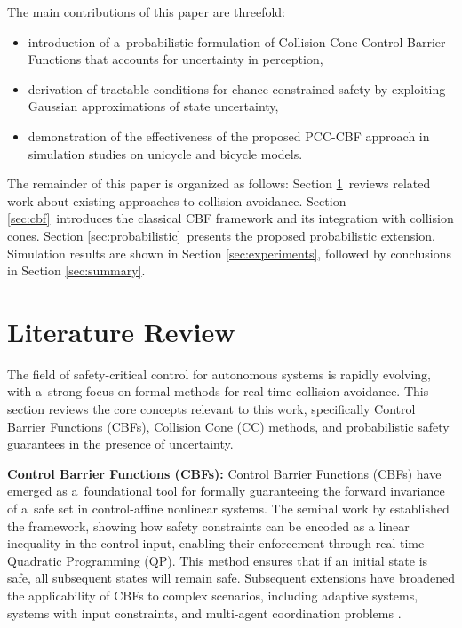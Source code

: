 \documentclass{svproc}
\begin{document}
The main contributions of this paper are threefold:
\begin{itemize}
    \item introduction of a~probabilistic formulation of Collision Cone Control
    Barrier Functions that accounts for uncertainty in perception,
    \item derivation of tractable conditions for chance-constrained safety by
    exploiting Gaussian approximations of state uncertainty,
    \item demonstration of the effectiveness of the proposed PCC-CBF approach in
    simulation studies on unicycle and bicycle models.
\end{itemize}

The remainder of this paper is organized as follows: 
Section \ref{sec:literature}~reviews related work about existing approaches
to collision avoidance. 
Section \ref{sec:cbf}~introduces the classical CBF framework and its integration
with collision cones. 
Section \ref{sec:probabilistic}~presents the proposed probabilistic extension. 
Simulation results are shown in Section \ref{sec:experiments}, %
followed by conclusions in Section \ref{sec:summary}.

\section{Literature Review}\label{sec:literature}
The field of safety-critical control for autonomous systems is rapidly evolving,
with a~strong focus on formal methods for real-time collision avoidance. This
section reviews the core concepts relevant to this work, specifically Control
Barrier Functions (CBFs), Collision Cone (CC) methods, and probabilistic safety
guarantees in the presence of uncertainty.

\textbf{Control Barrier Functions (CBFs):}
Control Barrier Functions (CBFs) have emerged as a~foundational tool for
formally guaranteeing the forward invariance of a~safe set in control-affine
nonlinear systems. The seminal work by \cite{ames2017control} established the
framework, showing how safety constraints can be encoded as a linear inequality
in the control input, enabling their enforcement through real-time Quadratic
Programming (QP). This method ensures that if an initial state is safe, all
subsequent states will remain safe. Subsequent extensions have broadened the
applicability of CBFs to complex scenarios, including adaptive systems, systems
with input constraints, and multi-agent coordination problems
\cite{ames2019control, 7524935}.
\end{document}
